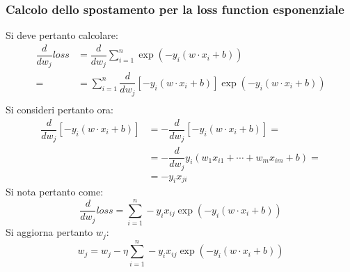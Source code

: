 		\subsubsection{Calcolo dello spostamento per la loss function esponenziale}
		Si deve pertanto calcolare:
		\begin{align*}
			\dfrac{d}{dw_j}loss &=\dfrac{d}{dw_j}\sum\limits_{i=1}^n\exp(-y_i(w\cdot x_i + b))\\=
												 &=\sum\limits_{i=1}^n\dfrac{d}{dw_j}[-y_i(w\cdot x_i+b)]\exp(-y_i(w\cdot x_i+b))\\
		\end{align*}
		Si consideri pertanto ora:
		\begin{align*}
			\dfrac{d}{dw_j}[-y_i(w\cdot x_i + b)]&=-\dfrac{d}{dw_j}[-y_i(w\cdot x_i + b)]=\\
																		&=-\dfrac{d}{dw_j}y_i(w_1x_{i1}+\cdots+w_mx_{im}+b)=\\
																		&=-y_ix_{ji}
		\end{align*}
		Si nota pertanto come:
		$$\dfrac{d}{dw_j}loss=\sum\limits_{i=1}^n-y_ix_{ij}\exp(-y_i(w\cdot x_i+b))$$
		Si aggiorna pertanto $w_j$:
		$$w_j=w_j-\eta\sum\limits_{i=1}^n-y_ix_{ij}\exp(-y_i(w\cdot x_i+b))$$
